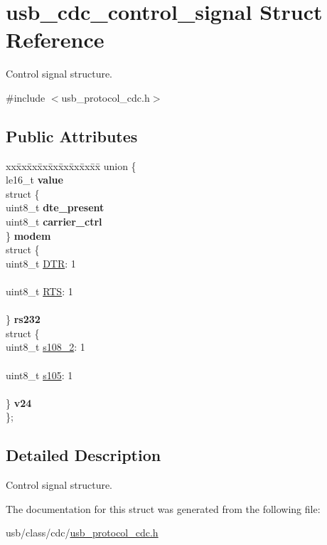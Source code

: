 \hypertarget{structusb__cdc__control__signal}{}\section{usb\+\_\+cdc\+\_\+control\+\_\+signal Struct Reference}
\label{structusb__cdc__control__signal}


Control signal structure.  




{\ttfamily \#include $<$usb\+\_\+protocol\+\_\+cdc.\+h$>$}

\subsection*{Public Attributes}
\begin{DoxyCompactItemize}
\item 
\mbox{\label{structusb__cdc__control__signal_ab4ebb1068b5f30f2d353f33f2729f976}} 
\begin{tabbing}
xx\=xx\=xx\=xx\=xx\=xx\=xx\=xx\=xx\=\kill
union \{\\
\>le16\_t {\bfseries value}\\
\>struct \{\\
\>\>uint8\_t {\bfseries dte\_present}\\
\>\>uint8\_t {\bfseries carrier\_ctrl}\\
\>\} {\bfseries modem}\\
\>struct \{\\
\>\>uint8\_t \hyperlink{structusb__cdc__control__signal_a325d909d32fb8222930cc567f7c9c1c1}{DTR}: 1\\
\>\>\\
\>\>uint8\_t \hyperlink{structusb__cdc__control__signal_a25d27154a09f8ce19445329cfc9ddfa4}{RTS}: 1\\
\>\>\\
\>\} {\bfseries rs232}\\
\>struct \{\\
\>\>uint8\_t \hyperlink{structusb__cdc__control__signal_adfcf2d61ff83dec43b4afac3a8af4980}{s108\_2}: 1\\
\>\>\\
\>\>uint8\_t \hyperlink{structusb__cdc__control__signal_ae2ef956aeedaadd9faf09f1ec48c6c40}{s105}: 1\\
\>\>\\
\>\} {\bfseries v24}\\
\}; \\

\end{tabbing}\end{DoxyCompactItemize}


\subsection{Detailed Description}
Control signal structure. 

The documentation for this struct was generated from the following file\+:\begin{DoxyCompactItemize}
\item 
usb/class/cdc/\hyperlink{usb__protocol__cdc_8h}{usb\+\_\+protocol\+\_\+cdc.\+h}\end{DoxyCompactItemize}
